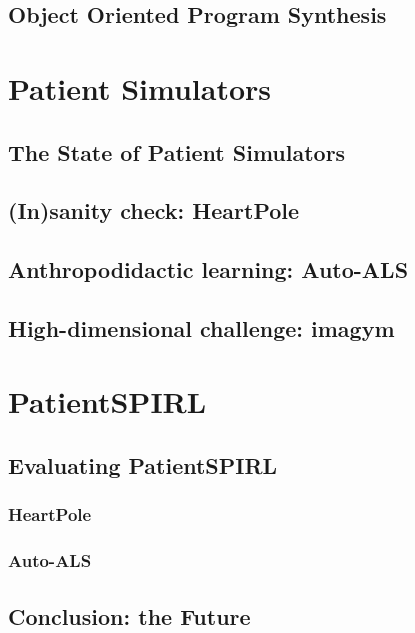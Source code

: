 \newpage
\chapter{Object Oriented Program Synthesis}
\label{ch:oops}

\part{Patient Simulators}
\label{part:simulators}

\newpage
\chapter{The State of Patient Simulators}
\label{ch:simulators-sota}

\newpage
\chapter{(In)sanity check: HeartPole}
\label{ch:heartpole}

\newpage
\chapter{Anthropodidactic learning: Auto-ALS}
\label{ch:auto-als}

\newpage
\chapter{High-dimensional challenge: imagym}
\label{ch:imagym}

\newpage


\part{PatientSPIRL}
\label{part:patientspirl}

\newpage
\chapter{Evaluating PatientSPIRL}
\label{ch:eval}

\section{HeartPole}


\section{Auto-ALS}


\newpage
\chapter{Conclusion: the Future}
\label{ch:conclusion}


\printbibliography


